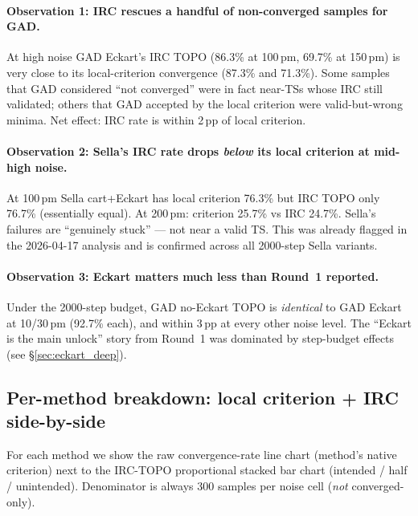 \documentclass[11pt]{article}
\begin{document}
\paragraph{Observation 1: IRC rescues a handful of non-converged samples
for GAD.} At high noise GAD Eckart's IRC TOPO (86.3\% at 100\,pm, 69.7\%
at 150\,pm) is very close to its local-criterion convergence (87.3\% and
71.3\%). Some samples that GAD considered ``not converged'' were in fact
near-TSs whose IRC still validated; others that GAD accepted by the local criterion were
valid-but-wrong minima. Net effect: IRC rate is within 2\,pp of local
criterion.

\paragraph{Observation 2: Sella's IRC rate drops \emph{below} its local
criterion at mid-high noise.} At 100\,pm Sella cart+Eckart has local criterion
76.3\% but IRC TOPO only 76.7\% (essentially equal). At 200\,pm: criterion
25.7\% vs IRC 24.7\%. Sella's failures are ``genuinely stuck'' —
not near a valid TS. This was already flagged in the 2026-04-17 analysis
and is confirmed across all 2000-step Sella variants.

\paragraph{Observation 3: Eckart matters much less than Round~1 reported.}
Under the 2000-step budget, GAD no-Eckart TOPO is \emph{identical} to GAD
Eckart at 10/30\,pm (92.7\% each), and within 3\,pp at every other noise
level. The ``Eckart is the main unlock'' story from Round~1 was dominated
by step-budget effects (see §\ref{sec:eckart_deep}).

\newpage
\clearpage
\subsection{Per-method breakdown: local criterion + IRC side-by-side}

For each method we show the raw convergence-rate line chart (method's
native criterion) next to the IRC-TOPO proportional stacked bar chart
(intended / half / unintended). Denominator is always 300 samples per
noise cell (\emph{not} converged-only).
\end{document}
